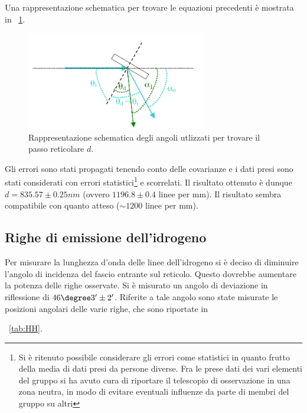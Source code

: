 \documentclass[a4paper,10pt]{article}
\begin{document}
{{{{{{Una rappresentazione schematica per trovare le equazioni precedenti è mostrata in \figurename{~\ref{fig:angoli}}.


\begin{figure}[H]
	\centering
	\includegraphics[width=0.7\textwidth]{../grafici/Angoli.png}
	\caption{Rappresentazione schematica degli angoli utlizzati per trovare il passo reticolare $d$.}
	\label{fig:angoli}
\end{figure}

Gli errori sono stati propagati tenendo conto delle covarianze e i dati presi sono stati considerati con errori statistici\footnote{Si è ritenuto possibile considerare gli errori come statistici in quanto frutto della media di dati presi da persone diverse. Fra le prese dati dei vari elementi del gruppo si ha avuto cura di riportare il telescopio di osservazione in una zona neutra, in modo di evitare eventuali influenze da parte di membri del gruppo su altri} e scorrelati. 
Il risultato ottenuto è dunque $d=835.57 \pm 0.25 nm$ (ovvero $1196.8 \pm 0.4$ linee per mm). Il risultato sembra compatibile con quanto atteso ($\sim 1200$ linee per mm).

\subsection{Righe di emissione dell'idrogeno}

Per misurare la lunghezza d'onda delle linee dell'idrogeno si è deciso di diminuire l'angolo di incidenza del fascio entrante sul reticolo. Questo
dovrebbe aumentare la potenza delle righe osservate. Si è misurato un angolo di deviazione in riflessione di $46\degree 3' \pm 2'$. Riferite a tale angolo sono state misurate le posizioni angolari delle varie righe, che sono riportate in \tablename{~\ref{tab:HH}.

}}}}}}}
\end{document}
